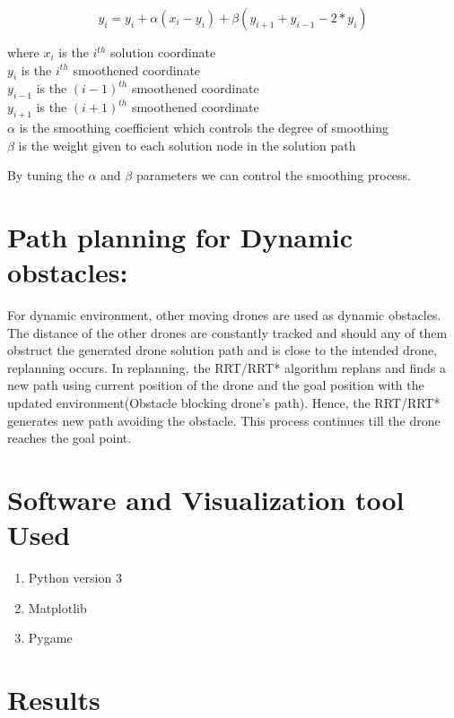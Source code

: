 \documentclass{IEEEtran}
\begin{document}
\begin{enumerate}
\boldmath	
\begin{equation}
y_i = y_i + \alpha(x_i - y_i) + \beta(y_{i+1} + y_{i-1} - 2*y_i)
\end{equation}
\unboldmath
\begin{center}
where $x_i$ is the $i^{th}$ solution coordinate \\
        $y_i$ is the  $i^{th}$ smoothened coordinate \\
	$y_{i-1}$ is the  $(i-1)^{th}$ smoothened coordinate \\
	$y_{i+1}$ is the  $(i+1)^{th}$ smoothened coordinate \\
	$\alpha$ is the smoothing coefficient which controls the degree of smoothing \\
	$\beta$ is the weight given to each solution node in the solution path \\
\end{center}
By tuning the $\alpha$ and $\beta$ parameters we can control the smoothing process.
\end{enumerate}
\section{ \textbf{Path planning for Dynamic obstacles:}}
For dynamic environment, other moving drones are used as dynamic obstacles.
The distance of the other drones are constantly tracked and should any of them 
obstruct the generated drone solution path
 and is close to the intended drone, replanning occurs.
 In replanning, the RRT/RRT* algorithm replans and finds a new path using current position of 
 the drone and the goal position with the updated environment(Obstacle blocking drone's path).
 Hence, the RRT/RRT* generates new path avoiding the obstacle. This process continues till the drone reaches the goal point.

\section{\textbf{Software and Visualization tool Used}}
\begin{enumerate}
\item Python version 3
\item Matplotlib
\item Pygame
\end{enumerate}
\section{\textbf{Results}}
\end{document}
